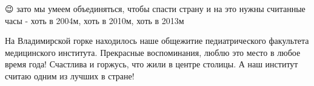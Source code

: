 \begin{itemize}
\begin{itemize}
😉 зато мы умеем объединяться, чтобы спасти страну и на это нужны считанные часы - хоть в 2004м, хоть в 2010м, хоть в 2013м
\end{itemize}

 

На Владимирской горке находилось наше общежитие педиатрического факультета
медицинского института. Прекрасные воспоминания, люблю это место в любое время
года! Счастлива и горжусь, что жили в центре столицы. А наш институт считаю
одним из лучших в стране!
\end{itemize}


